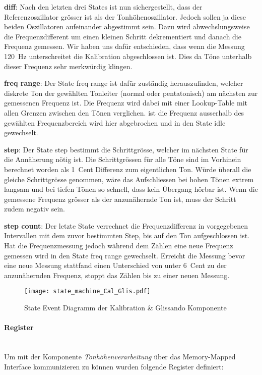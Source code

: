\textbf{diff}:
Nach den letzten drei States ist nun sichergestellt, dass der Referenzoszillator grösser ist als der Tonhöhenoszillator. Jedoch sollen ja diese beiden Oszillatoren aufeinander abgestimmt sein. Dazu wird abwechslungsweise die Frequenzdifferent um einen kleinen Schritt dekrementiert und danach die Frequenz gemessen. Wir haben uns dafür entschieden, dass wenn die Messung \SI{120}{Hz} unterschreitet die Kalibration abgeschlossen ist. Dies da Töne unterhalb dieser Frequenz sehr merkwürdig klingen.

\textbf{freq range}:
Der State freq range ist dafür zuständig herauszufinden, welcher diskrete Ton der gewählten Tonleiter (normal oder pentatonisch) am nächsten zur gemessenen Frequenz ist. Die Frequenz wird dabei mit einer Lookup-Table mit allen Grenzen zwischen den Tönen verglichen. ist die Frequenz ausserhalb des gewählten Frequenzbereich wird hier abgebrochen und in den State idle gewechselt.

\textbf{step}:
Der State step bestimmt die Schrittgrösse, welcher im nächsten State für die Annäherung nötig ist. Die Schrittgrössen für alle Töne sind im Vorhinein berechnet worden als \SI{1}{Cent} Differenz zum eigentlichen Ton. Würde überall die gleiche Schrittgrösse genommen, wäre das Aufschliessen bei hohen Tönen extrem langsam und bei tiefen Tönen so schnell, dass kein Übergang hörbar ist. Wenn die gemessene Frequenz grösser als der anzunähernde Ton ist, muss der Schritt zudem negativ sein.

\textbf{step count}:
Der letzte State verrechnet die Frequenzdifferenz in vorgegebenen Intervallen mit dem zuvor bestimmten Step, bis auf den Ton aufgeschlossen ist. Hat die Frequenzmessung jedoch während dem Zählen eine neue Frequenz gemessen wird in den State freq range gewechselt. Erreicht die Messung bevor eine neue Messung stattfand einen Unterschied von unter \SI{6}{Cent} zu der anzunähernden Frequenz, stoppt das Zählen bis zu einer neuen Messung.

\begin{figure}[h!]
	\centering
	\texttt{[image: state\_machine\_Cal\_Glis.pdf]}
	\caption{State Event Diagramm der Kalibration \& Glissando Komponente} 
	\label{img:state_event_Cal_Glis}
\end{figure} 

\paragraph{Register}\mbox{}\\
Um mit der Komponente \textit{Tonhöhenverarbeitung} über das Memory-Mapped Interface kommunizieren zu können wurden folgende Register definiert:

